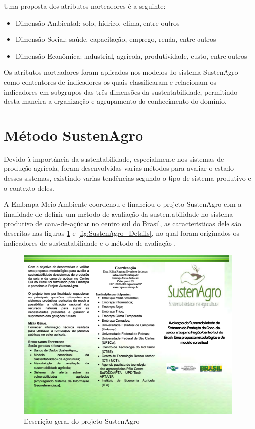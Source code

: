Uma proposta dos atributos norteadores é a seguinte:
\begin{itemize}
\item Dimensão Ambiental: solo, hídrico, clima, entre outros
\item Dimensão Social: saúde, capacitação, emprego, renda, entre outros
\item Dimensão Econômica: industrial, agrícola, produtividade, custo, entre
outros
\end{itemize}
Os atributos norteadores foram aplicados nos modelos do sistema SustenAgro
como contentores de indicadores os quais classificaram e relacionam
os indicadores em subgrupos das três dimensões da sustentabilidade,
permitindo desta maneira a organização e agrupamento do conhecimento
do domínio.

\section{Método SustenAgro}

Devido à importância da sustentabilidade, especialmente nos sistemas
de produção agrícola, foram desenvolvidas varias métodos para avaliar
o estado desses sistemas, existindo varias tendências segundo o tipo
de sistema produtivo e o contexto deles.

A Embrapa Meio Ambiente coordenou e financiou o projeto SustenAgro
com a finalidade de definir um método de avaliação da sustentabilidade
no sistema produtivo de cana-de-açúcar no centro sul do Brasil, as
características dele são descritas nas figuras \ref{fig:SustenAgro_Description}
e \ref{fig:SustenAgro_Details}, no qual foram originados os indicadores
de sustentabilidade e o método de avaliação \citep{oliveira:2013,BRUMATTI:2015}.

\vfill{}

\pagebreak{}

\begin{figure}[H]
\begin{centering}
\includegraphics[width=1\columnwidth]{figures/folderEmbrapa1}
\par\end{centering}
\caption{Descrição geral do projeto SustenAgro \label{fig:SustenAgro_Description}}
\end{figure}

